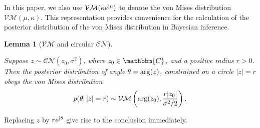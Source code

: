 \documentclass[conference,10pt,twocolumn]{IEEEtran}
\newtheorem{lemma}{\bf Lemma}
\theoremstyle{nonumberplain}
\def \CN {\mathcal{CN}}
\def \VM {\mathcal{VM}}
\begin{document}
    In this paper, we also use $\VM(\kappa e^{{\rm j}\mu})$ to denote the von Mises distribution $\VM(\mu, \kappa)$. 
    This representation provides convenience for the calculation of the posterior distribution of the von Mises distribution in Bayesian inference.

    \begin{lemma}[$\VM$ and circular $\CN$]\label{lemma_2} \mbox{}\par
        Suppose $z \sim \CN(z_0, \sigma^2)$, where $z_0 \in \mathbbm{C}$, and a positive radius $r>0$. Then the posterior distribution of angle $\theta= {\rm arg} (z)$, constrained on a circle $|z|=r$ obeys the von Mises distribution
        \begin{equation}
            p(\theta |\, |z|=r) \sim \VM\left({\rm arg}(z_0), \frac{r|z_0|}{\sigma^2/2}\right).
        \end{equation}
    \end{lemma}
    \begin{IEEEproof}
        Replacing $z$ by $r e^{{\rm j} \theta}$ give rise to the conclusion immediately. 
    \end{IEEEproof}
    
\end{document}

